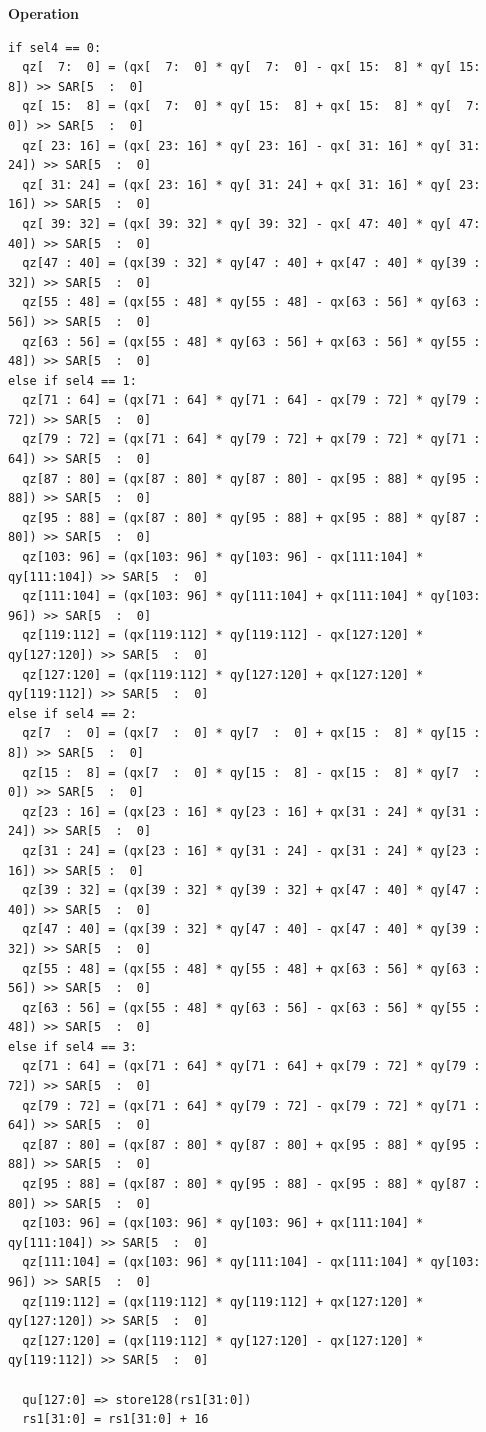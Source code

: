 \textbf{Operation}\\
\begin{lstlisting}
if sel4 == 0:
  qz[  7:  0] = (qx[  7:  0] * qy[  7:  0] - qx[ 15:  8] * qy[ 15:  8]) >> SAR[5  :  0]
  qz[ 15:  8] = (qx[  7:  0] * qy[ 15:  8] + qx[ 15:  8] * qy[  7:  0]) >> SAR[5  :  0]
  qz[ 23: 16] = (qx[ 23: 16] * qy[ 23: 16] - qx[ 31: 16] * qy[ 31: 24]) >> SAR[5  :  0]
  qz[ 31: 24] = (qx[ 23: 16] * qy[ 31: 24] + qx[ 31: 16] * qy[ 23: 16]) >> SAR[5  :  0]
  qz[ 39: 32] = (qx[ 39: 32] * qy[ 39: 32] - qx[ 47: 40] * qy[ 47: 40]) >> SAR[5  :  0]
  qz[47 : 40] = (qx[39 : 32] * qy[47 : 40] + qx[47 : 40] * qy[39 : 32]) >> SAR[5  :  0]
  qz[55 : 48] = (qx[55 : 48] * qy[55 : 48] - qx[63 : 56] * qy[63 : 56]) >> SAR[5  :  0]
  qz[63 : 56] = (qx[55 : 48] * qy[63 : 56] + qx[63 : 56] * qy[55 : 48]) >> SAR[5  :  0]
else if sel4 == 1:
  qz[71 : 64] = (qx[71 : 64] * qy[71 : 64] - qx[79 : 72] * qy[79 : 72]) >> SAR[5  :  0]
  qz[79 : 72] = (qx[71 : 64] * qy[79 : 72] + qx[79 : 72] * qy[71 : 64]) >> SAR[5  :  0]
  qz[87 : 80] = (qx[87 : 80] * qy[87 : 80] - qx[95 : 88] * qy[95 : 88]) >> SAR[5  :  0]
  qz[95 : 88] = (qx[87 : 80] * qy[95 : 88] + qx[95 : 88] * qy[87 : 80]) >> SAR[5  :  0]
  qz[103: 96] = (qx[103: 96] * qy[103: 96] - qx[111:104] * qy[111:104]) >> SAR[5  :  0]
  qz[111:104] = (qx[103: 96] * qy[111:104] + qx[111:104] * qy[103: 96]) >> SAR[5  :  0]
  qz[119:112] = (qx[119:112] * qy[119:112] - qx[127:120] * qy[127:120]) >> SAR[5  :  0]
  qz[127:120] = (qx[119:112] * qy[127:120] + qx[127:120] * qy[119:112]) >> SAR[5  :  0]
else if sel4 == 2:
  qz[7  :  0] = (qx[7  :  0] * qy[7  :  0] + qx[15 :  8] * qy[15 :  8]) >> SAR[5  :  0]
  qz[15 :  8] = (qx[7  :  0] * qy[15 :  8] - qx[15 :  8] * qy[7  :  0]) >> SAR[5  :  0]
  qz[23 : 16] = (qx[23 : 16] * qy[23 : 16] + qx[31 : 24] * qy[31 : 24]) >> SAR[5  :  0]
  qz[31 : 24] = (qx[23 : 16] * qy[31 : 24] - qx[31 : 24] * qy[23 : 16]) >> SAR[5 :  0]
  qz[39 : 32] = (qx[39 : 32] * qy[39 : 32] + qx[47 : 40] * qy[47 : 40]) >> SAR[5  :  0]
  qz[47 : 40] = (qx[39 : 32] * qy[47 : 40] - qx[47 : 40] * qy[39 : 32]) >> SAR[5  :  0]
  qz[55 : 48] = (qx[55 : 48] * qy[55 : 48] + qx[63 : 56] * qy[63 : 56]) >> SAR[5  :  0]
  qz[63 : 56] = (qx[55 : 48] * qy[63 : 56] - qx[63 : 56] * qy[55 : 48]) >> SAR[5  :  0]
else if sel4 == 3:
  qz[71 : 64] = (qx[71 : 64] * qy[71 : 64] + qx[79 : 72] * qy[79 : 72]) >> SAR[5  :  0]
  qz[79 : 72] = (qx[71 : 64] * qy[79 : 72] - qx[79 : 72] * qy[71 : 64]) >> SAR[5  :  0]
  qz[87 : 80] = (qx[87 : 80] * qy[87 : 80] + qx[95 : 88] * qy[95 : 88]) >> SAR[5  :  0]
  qz[95 : 88] = (qx[87 : 80] * qy[95 : 88] - qx[95 : 88] * qy[87 : 80]) >> SAR[5  :  0]
  qz[103: 96] = (qx[103: 96] * qy[103: 96] + qx[111:104] * qy[111:104]) >> SAR[5  :  0]
  qz[111:104] = (qx[103: 96] * qy[111:104] - qx[111:104] * qy[103: 96]) >> SAR[5  :  0]
  qz[119:112] = (qx[119:112] * qy[119:112] + qx[127:120] * qy[127:120]) >> SAR[5  :  0]
  qz[127:120] = (qx[119:112] * qy[127:120] - qx[127:120] * qy[119:112]) >> SAR[5  :  0]

  qu[127:0] => store128(rs1[31:0])
  rs1[31:0] = rs1[31:0] + 16
\end{lstlisting}


